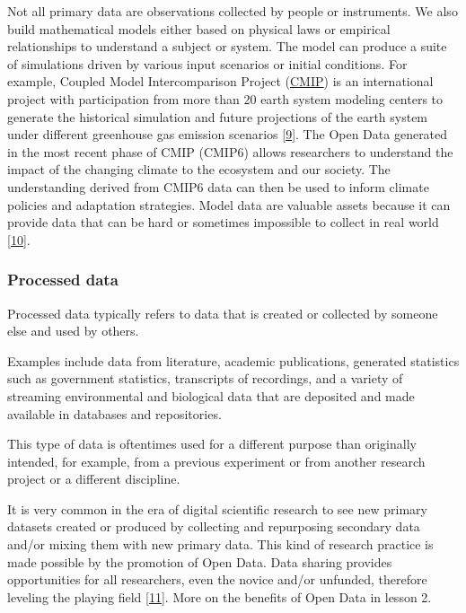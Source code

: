 \documentclass[
  letterpaper,
  DIV=11,
  numbers=noendperiod]{scrreport}
\begin{document}
Not all primary data are observations collected by people or
instruments. We also build mathematical models either based on physical
laws or empirical relationships to understand a subject or system. The
model can produce a suite of simulations driven by various input
scenarios or initial conditions. For example, Coupled Model
Intercomparison Project
(\href{https://www.wcrp-climate.org/wgcm-cmip}{CMIP}) is an
international project with participation from more than 20 earth system
modeling centers to generate the historical simulation and future
projections of the earth system under different greenhouse gas emission
scenarios {[}\href{https://www.wcrp-climate.org/wgcm-cmip}{9}{]}. The
Open Data generated in the most recent phase of CMIP (CMIP6) allows
researchers to understand the impact of the changing climate to the
ecosystem and our society. The understanding derived from CMIP6 data can
then be used to inform climate policies and adaptation strategies. Model
data are valuable assets because it can provide data that can be hard or
sometimes impossible to collect in real world
{[}\href{https://www.climateurope.eu/a-short-introduction-to-climate-models-cmip-cmip6/}{10}{]}.

\hypertarget{processed-data}{%
\subsubsection*{Processed data}\label{processed-data}}

Processed data typically refers to data that is created or collected by
someone else and used by others.

Examples include data from literature, academic publications, generated
statistics such as government statistics, transcripts of recordings, and
a variety of streaming environmental and biological data that are
deposited and made available in databases and repositories.

This type of data is oftentimes used for a different purpose than
originally intended, for example, from a previous experiment or from
another research project or a different discipline.

It is very common in the era of digital scientific research to see new
primary datasets created or produced by collecting and repurposing
secondary data and/or mixing them with new primary data. This kind of
research practice is made possible by the promotion of Open Data. Data
sharing provides opportunities for all researchers, even the novice
and/or unfunded, therefore leveling the playing field
{[}\href{https://www.sciencedirect.com/science/article/abs/pii/S0023969001910987?via\%3Dihub}{11}{]}.
More on the benefits of Open Data in lesson 2.
\end{document}
